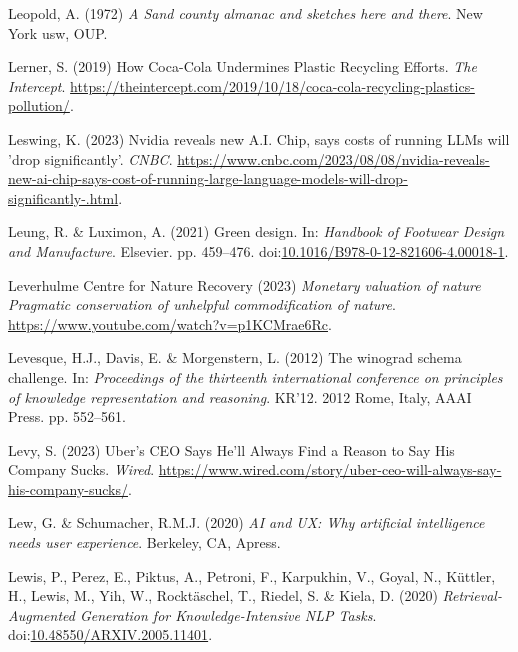 \documentclass[
  letterpaper,
  DIV=11,
  numbers=noendperiod]{scrartcl}
\newlength{\cslhangindent}
\newenvironment{CSLReferences}[2] %
 {\begin{list}{}{%
  \setlength{\itemindent}{0pt}
  \setlength{\leftmargin}{0pt}
  \setlength{\parsep}{0pt}
  \ifodd #1
   \setlength{\leftmargin}{\cslhangindent}
   \setlength{\itemindent}{-1\cslhangindent}
  \fi
  \setlength{\itemsep}{#2\baselineskip}}}
 {\end{list}}
\begin{document}
\begin{CSLReferences}{0}{1}
Leopold, A. (1972) \emph{A {Sand} county almanac and sketches here and
there}. New York usw, OUP.

Lerner, S. (2019) How {Coca-Cola Undermines Plastic Recycling Efforts}.
\emph{The Intercept}.
\url{https://theintercept.com/2019/10/18/coca-cola-recycling-plastics-pollution/}.

Leswing, K. (2023) Nvidia reveals new {A}.{I}. Chip, says costs of
running {LLMs} will 'drop significantly'. \emph{CNBC}.
\url{https://www.cnbc.com/2023/08/08/nvidia-reveals-new-ai-chip-says-cost-of-running-large-language-models-will-drop-significantly-.html}.

Leung, R. \& Luximon, A. (2021) Green design. In: \emph{Handbook of
{Footwear Design} and {Manufacture}}. Elsevier. pp. 459--476.
doi:\href{https://doi.org/10.1016/B978-0-12-821606-4.00018-1}{10.1016/B978-0-12-821606-4.00018-1}.

Leverhulme Centre for Nature Recovery (2023) \emph{Monetary valuation of
nature {Pragmatic} conservation of unhelpful commodification of nature}.
\url{https://www.youtube.com/watch?v=p1KCMrae6Rc}.

Levesque, H.J., Davis, E. \& Morgenstern, L. (2012) The winograd schema
challenge. In: \emph{Proceedings of the thirteenth international
conference on principles of knowledge representation and reasoning}.
{KR}'12. 2012 Rome, Italy, AAAI Press. pp. 552--561.

Levy, S. (2023) Uber's {CEO Says He}'ll {Always Find} a {Reason} to {Say
His Company Sucks}. \emph{Wired}.
\url{https://www.wired.com/story/uber-ceo-will-always-say-his-company-sucks/}.

Lew, G. \& Schumacher, R.M.J. (2020) \emph{{AI} and {UX}: Why artificial
intelligence needs user experience}. Berkeley, CA, Apress.

Lewis, P., Perez, E., Piktus, A., Petroni, F., Karpukhin, V., Goyal, N.,
Küttler, H., Lewis, M., Yih, W., Rocktäschel, T., Riedel, S. \& Kiela,
D. (2020) \emph{Retrieval-{Augmented Generation} for
{Knowledge-Intensive NLP Tasks}}.
doi:\href{https://doi.org/10.48550/ARXIV.2005.11401}{10.48550/ARXIV.2005.11401}.


\end{CSLReferences}
\end{document}

